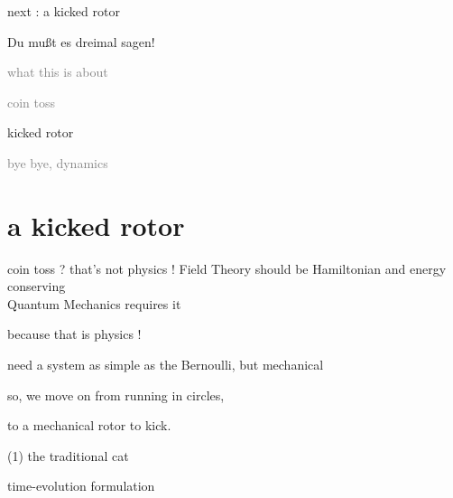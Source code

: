 \begin{frame}{next : a kicked rotor} %
\begin{bartlett}{
Du mu{\ss}t es dreimal sagen!
        }
\end{bartlett}
\vfill
\begin{enumerate}
              \item \textcolor{gray}{\small
{}
{what this is about}
              \item
{}
{coin toss}
                  }
              \item {\Large
{}
{kicked rotor}
                  }\textcolor{gray}{\small
              \item
{}
{\catlatt}
              \item
{}
{bye bye, dynamics}
                    }
            \end{enumerate}
\end{frame} %

\section[a kicked rotor]
 {a kicked rotor}

\begin{frame}{coin toss ? that's not physics !}
Field Theory should be
Hamiltonian and energy conserving \\
Quantum Mechanics requires it

\hfill
because {\color{blue}that is physics} {\color{red}!}
\bigskip

need a system as simple
as the Bernoulli, but {\color{blue}mechanical}
\bigskip

so, we move on from running in circles,

\hfill
to a mechanical {\color{blue}rotor} to kick.
\end{frame} %

\begin{frame}{(1) the traditional cat}
\vfill

\begin{center}
{\huge time-evolution formulation}
\end{center}

\vfill
\end{frame} %

